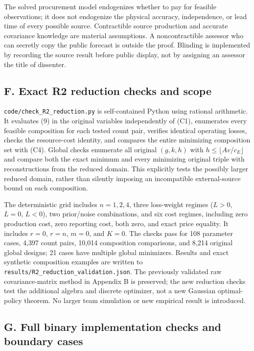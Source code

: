 \documentclass[
  11pt,
]{article}
\begin{document}
The solved procurement model endogenizes whether to pay for feasible
observations; it does not endogenize the physical accuracy,
independence, or lead time of every possible source. Contractible source
production and accurate covariance knowledge are material assumptions. A
noncontractible assessor who can secretly copy the public forecast is
outside the proof. Blinding is implemented by recording the source
result before public display, not by assigning an assessor the title of
dissenter.

\subsection{F. Exact R2 reduction checks and
scope}\label{f.-exact-r2-reduction-checks-and-scope}

\texttt{code/check\_R2\_reduction.py} is self-contained Python using
rational arithmetic. It evaluates (9) in the original variables
independently of (C1), enumerates every feasible composition for each
tested count pair, verifies identical operating losses, checks the
resource-cost identity, and compares the entire minimizing composition
set with (C4). Global checks enumerate all original \((g,k,h)\) with
\(h\leq\lfloor Av/c_E\rfloor\) and compare both the exact minimum and
every minimizing original triple with reconstructions from the reduced
domain. This explicitly tests the possibly larger reduced domain, rather
than silently imposing an incompatible external-source bound on each
composition.

The deterministic grid includes \(n=1,2,4\), three loss-weight regimes
(\(L>0\), \(L=0\), \(L<0\)), two prior/noise combinations, and six cost
regimes, including zero production cost, zero reporting cost, both zero,
and exact price equality. It includes \(r=0\), \(r=n\), \(m=0\), and
\(K=0\). The checks pass for 108 parameter cases, 4,397 count pairs,
10,014 composition comparisons, and 8,214 original global designs; 21
cases have multiple global minimizers. Results and exact synthetic
composition examples are written to
\texttt{results/R2\_reduction\_validation.json}. The previously
validated raw covariance-matrix method in Appendix B is preserved; the
new reduction checks test the additional algebra and discrete optimizer,
not a new Gaussian optimal-policy theorem. No larger team simulation or
new empirical result is introduced.

\subsection{G. Full binary implementation checks and boundary
cases}\label{g.-full-binary-implementation-checks-and-boundary-cases}
\end{document}
